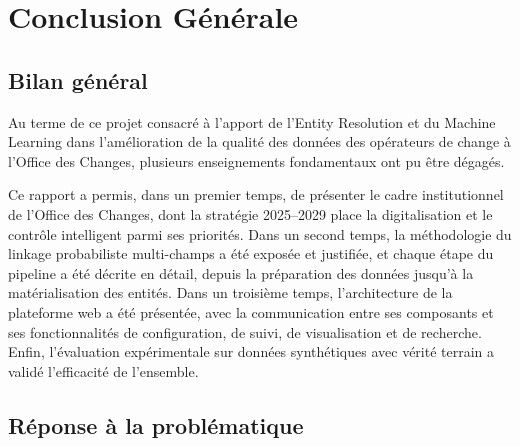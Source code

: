 \chapter*{Conclusion G\'{e}n\'{e}rale}
\label{chapter:Conclusion}
\setcounter{section}{0}

\section{Bilan g\'{e}n\'{e}ral}

Au terme de ce projet consacr\'{e} \`{a} l'apport de l'Entity Resolution et du Machine Learning dans l'am\'{e}lioration de la qualit\'{e} des donn\'{e}es des op\'{e}rateurs de change \`{a} l'Office des Changes, plusieurs enseignements fondamentaux ont pu \^{e}tre d\'{e}gag\'{e}s.

Ce rapport a permis, dans un premier temps, de pr\'{e}senter le cadre institutionnel de l'Office des Changes, dont la strat\'{e}gie 2025--2029 place la digitalisation et le contr\^{o}le intelligent parmi ses priorit\'{e}s. Dans un second temps, la m\'{e}thodologie du linkage probabiliste multi-champs a \'{e}t\'{e} expos\'{e}e et justifi\'{e}e, et chaque \'{e}tape du pipeline a \'{e}t\'{e} d\'{e}crite en d\'{e}tail, depuis la pr\'{e}paration des donn\'{e}es jusqu'\`{a} la mat\'{e}rialisation des entit\'{e}s. Dans un troisi\`{e}me temps, l'architecture de la plateforme web a \'{e}t\'{e} pr\'{e}sent\'{e}e, avec la communication entre ses composants et ses fonctionnalit\'{e}s de configuration, de suivi, de visualisation et de recherche. Enfin, l'\'{e}valuation exp\'{e}rimentale sur donn\'{e}es synth\'{e}tiques avec v\'{e}rit\'{e} terrain a valid\'{e} l'efficacit\'{e} de l'ensemble.

\section{R\'{e}ponse \`{a} la probl\'{e}matique}

